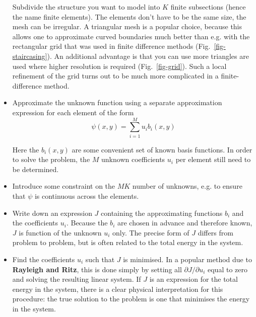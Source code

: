 \begin{itemize}
Subdivide the structure you want to model into $K$ finite subsections (hence the name finite elements). The elements don't have to be the same size, the mesh can be irregular. A triangular mesh is a popular choice, because this allows one to approximate curved boundaries much better than e.g. with the rectangular grid that was used in finite difference methods (Fig.~\ref{fig-staircasing}). An additional advantage is that you can use more triangles are used where higher resolution is required (Fig.~\ref{fig-grid}). Such a local refinement of the grid turns out to be much more complicated in a finite-difference method.
  

\item
Approximate the unknown function using a separate approximation expression for each element of the form
\begin{equation}
\psi(x,y) = \sum_{i=1}^M u_i b_i(x,y) \label{eq-fe-1}
\end{equation}

Here the $b_i(x,y)$ are some convenient set of known basis functions. In order to solve the problem, the $M$ unknown coefficients $u_i$ per element still need to be determined.
\item
  Introduce some constraint on the $MK$ number of unknowns, e.g. to ensure that $\psi$ is continuous across the elements.



\item
Write down an expression $J$ containing the approximating functions $b_i$ and the coefficients $u_i$. Because the $b_i$ are chosen in advance and therefore known, $J$ is function of the unknown $u_i$ only. The precise form of $J$ differs from problem to problem, but is often related to the total energy in the system.
\item
Find the coefficients $u_i$ such that $J$ is minimised. In a popular method due to \textbf{Rayleigh and Ritz}, this is done simply by setting all $\partial J / \partial u_i$ equal to zero and solving the resulting linear system. If $J$ is an expression for the total energy in the system, there is a clear physical interpretation for this procedure: the true solution to the problem is one that minimises the energy in the system.
\end{itemize}


\pagebreak



